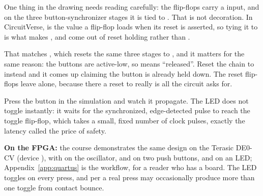 
\noindent One thing in the drawing needs reading carefully: the flip-flops carry a 
input, and on the three button-synchronizer stages it is tied to . That is not decoration.
In CircuitVerse,  is the value a flip-flop loads when its reset is asserted, so tying
it to  is what makes ,  and  come out
of reset holding  rather than .

That matches , which resets the same three stages to , and
it matters for the same reason: the buttons are active-low, so  means ``released''. Reset
the chain to  instead and it comes up claiming the button is already held down. The reset
flip-flops leave  alone, because there a reset to  really is all the circuit
asks for.

Press the button in the simulation and watch it propagate. The LED does not toggle instantly: it
waits for the synchronized, edge-detected pulse to reach the toggle flip-flop, which takes a small,
fixed number of clock pulses, exactly the latency  called the price of safety.

\textbf{On the FPGA:} the course demonstrates the same design on the Terasic DE0-CV (device
), with  on the  oscillator,  and
 on two push buttons, and  on an LED; Appendix~\ref{app:quartus} is the
workflow, for a reader who has a board. The LED toggles on every press, and per  a
real press may occasionally produce more than one toggle from contact bounce.
